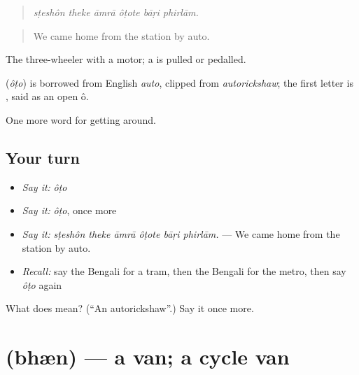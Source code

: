 \begin{quote}
     
\end{quote}

\begin{quote}
\emph{sṭeshôn theke āmrā ôṭote bāṛi phirlām.}
\end{quote}

\begin{quote}
We came home from the station by auto.
\end{quote}

The three-wheeler with a motor; a  is pulled or pedalled.

\begin{cousinweb}
\textbf{} (\emph{ôṭo}) is borrowed from English \emph{auto}, clipped from \emph{autorickshaw}; the first letter is , said as an open ô.
\end{cousinweb}

\begin{grammarlens}[title={What you've built}]
One more word for getting around.
\end{grammarlens}

\subsection*{Your turn}
\begin{itemize}
\raggedright
  \item \emph{Say it:} \emph{ôṭo}
  \item \emph{Say it:} \emph{ôṭo}, once more
  \item \emph{Say it:} \emph{sṭeshôn theke āmrā ôṭote bāṛi phirlām.} — We came home from the station by auto.
  \item \emph{Recall:} say the Bengali for a tram, then the Bengali for the metro, then say \emph{ôṭo} again
\end{itemize}

\begin{tcolorbox}[breakable,colback=teal!4,colframe=teal!35!black,title={Before you move on}]
What does  mean? (\textquotedblleft{}An autorickshaw\textquotedblright{}.) Say it once more.
\end{tcolorbox}
\section[\texorpdfstring{\bn{ভ্যান} (bhæn)}{ভ্যান (bhæn)}]{ (bhæn) — a van; a cycle van}

